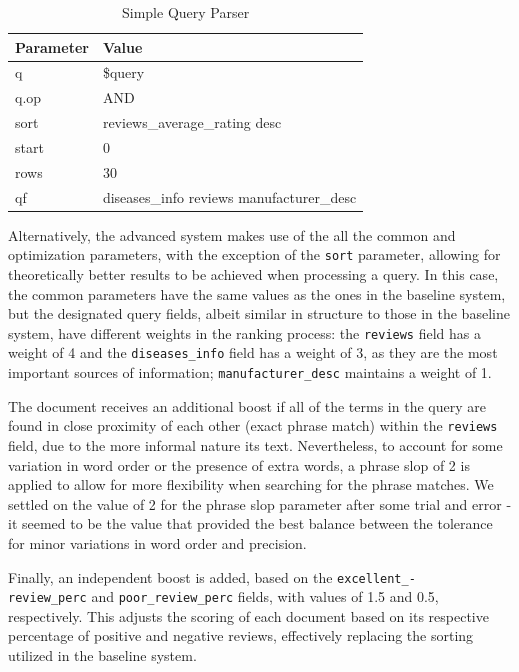 \documentclass[sigconf]{acmart}
\begin{document}
\begin{table}[H]
    \begin{tabular}{ll}
    \toprule
    Parameter & Value\\
    \midrule
    q & \$query\\
    q.op & AND\\
    sort & reviews\_average\_rating desc\\
    start & 0\\
    rows & 30\\
    qf & diseases\_info reviews manufacturer\_desc\\
    \bottomrule
    \end{tabular}
    \caption{Simple Query Parser}
    \label{tab:simple_query}
\end{table}

Alternatively, the advanced system makes use of the all the common and optimization parameters, with the exception of the \texttt{sort} parameter, allowing for theoretically better results to be achieved when processing a query. In this case, the common parameters have the same values as the ones in the baseline system, but the designated query fields, albeit similar in structure to those in the baseline system, have different weights in the ranking process: the \texttt{reviews} field has a weight of 4 and the \texttt{diseases\_info} field has a weight of 3, as they are the most important sources of information; \texttt{manufacturer\_desc} maintains a weight of 1.

The document receives an additional boost if all of the terms in the query are found in close proximity of each other (exact phrase match) within the \texttt{reviews} field, due to the more informal nature its text. Nevertheless, to account for some variation in word order or the presence of extra words, a phrase slop of 2 is applied to allow for more flexibility when searching for the phrase matches. We settled on the value of 2 for the phrase slop parameter after some trial and error - it seemed to be the value that provided the best balance between the tolerance for minor variations in word order and precision.

Finally, an independent boost is added, based on the \texttt{excellent\_-\\review\_perc} and \texttt{poor\_review\_perc} fields, with values of 1.5 and 0.5, respectively. This adjusts the scoring of each document based on its respective percentage of positive and negative reviews, effectively replacing the sorting utilized in the baseline system.
\end{document}

